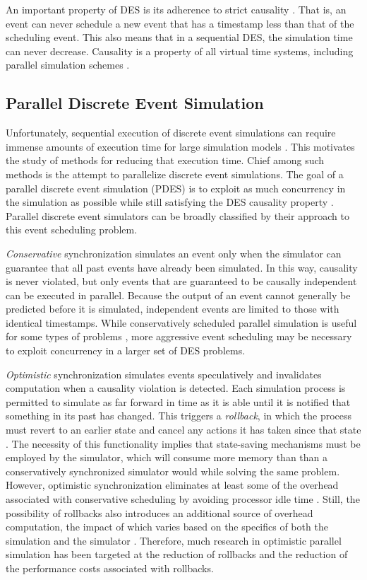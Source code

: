\documentclass[11pt]{book}
\begin{document}
An important property of DES is its adherence to strict causality
\cite{fujimoto-pdes}. That is, an event can never schedule a new event that has
a timestamp less than that of the scheduling event. This also means that in a
sequential DES, the simulation time can never decrease. Causality is a property
of all virtual time systems, including parallel simulation schemes
\cite{lamport-78}.

\subsection{\textbf{Parallel Discrete Event Simulation}}

Unfortunately, sequential execution of discrete event simulations can require
immense amounts of execution time for large simulation models
\cite{fujimoto-pdes}. This motivates the study of methods for reducing that
execution time. Chief among such methods is the attempt to parallelize discrete
event simulations. The goal of a parallel discrete event simulation (PDES) is to
exploit as much concurrency in the simulation as possible while still satisfying
the DES causality property \cite{fujimoto-89b}. Parallel discrete event
simulators can be broadly classified by their approach to this event scheduling
problem.

\textit{Conservative} synchronization simulates an event only when the simulator can
guarantee that all past events have already been simulated. In this way,
causality is never violated, but only events that are guaranteed to be causally
independent can be executed in parallel. Because the output of an event cannot
generally be predicted before it is simulated, independent events are limited to
those with identical timestamps. While conservatively scheduled parallel
simulation is useful for some types of problems \cite{nicol-93b}, more
aggressive event scheduling may be necessary to exploit concurrency in a larger
set of DES problems.

\textit{Optimistic} synchronization simulates events speculatively and invalidates
computation when a causality violation is detected. Each simulation process is
permitted to simulate as far forward in time as it is able until it is notified
that something in its past has changed. This triggers a \textit{rollback}, in
which the process must revert to an earlier state and cancel any actions it has
taken since that state \cite{nicol-93b}. The necessity of this functionality
implies that state-saving mechanisms must be employed by the simulator, which
will consume more memory than than a conservatively synchronized simulator would
while solving the same problem. However, optimistic synchronization eliminates at least some of the
overhead associated with conservative scheduling by avoiding processor idle time
\cite{nicol-93b}. Still, the possibility of rollbacks also introduces an
additional source of overhead computation, the impact of which varies based on
the specifics of both the simulation and the simulator
\cite{fujimoto-pdes}. Therefore, much research in optimistic parallel simulation
has been targeted at the reduction of rollbacks and the reduction of the
performance costs associated with rollbacks.
\end{document}
